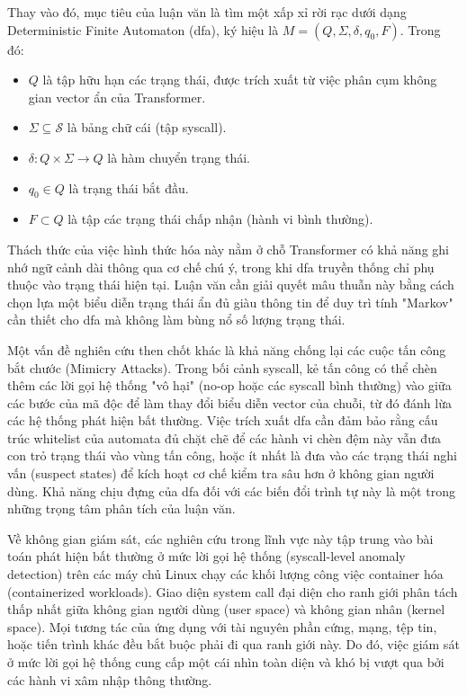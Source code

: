 \documentclass[../main.tex]{subfiles}
\begin{document}
Thay vào đó, mục tiêu của luận văn là tìm một xấp xỉ rời rạc dưới dạng
Deterministic Finite Automaton (\gls{dfa}), ký hiệu là $M = (Q, \Sigma,
\delta, q_0, F)$.
Trong đó:
\begin{itemize}
  \item $Q$ là tập hữu hạn các trạng thái, được trích xuất từ việc
    phân cụm không gian vector ẩn của Transformer.
  \item $\Sigma \subseteq \mathcal{S}$ là bảng chữ cái (tập \gls{syscall}).
  \item $\delta: Q \times \Sigma \to Q$ là hàm chuyển trạng thái.
  \item $q_0 \in Q$ là trạng thái bắt đầu.
  \item $F \subset Q$ là tập các trạng thái chấp nhận (hành vi bình thường).
\end{itemize}
Thách thức của việc hình thức hóa này nằm ở chỗ Transformer có khả năng
ghi nhớ ngữ cảnh dài thông qua cơ chế chú ý, trong khi \gls{dfa} truyền thống
chỉ phụ thuộc vào trạng thái hiện tại. Luận văn cần giải quyết mâu thuẫn
này bằng cách chọn lựa một biểu diễn trạng thái ẩn đủ giàu thông tin để
duy trì tính "Markov" cần thiết cho \gls{dfa} mà không làm bùng nổ số lượng
trạng thái.

Một vấn đề nghiên cứu then chốt khác là khả năng chống lại các cuộc
tấn công bắt chước (Mimicry Attacks). Trong bối cảnh \gls{syscall}, kẻ tấn
công có thể chèn thêm các lời gọi hệ thống "vô hại" (no-op hoặc các
\gls{syscall} bình thường) vào giữa các bước của mã độc để làm thay đổi
biểu diễn vector của chuỗi, từ đó đánh lừa các hệ thống phát hiện
bất thường. Việc trích xuất \gls{dfa} cần đảm bảo rằng cấu trúc whitelist
của automata đủ chặt chẽ để các hành vi chèn đệm này vẫn đưa con trỏ
trạng thái vào vùng tấn công, hoặc ít nhất là đưa vào các trạng thái
nghi vấn (suspect states) để kích hoạt cơ chế kiểm tra sâu hơn ở không gian
người dùng. Khả năng chịu đựng của \gls{dfa} đối với các biến đổi trình tự
này là một trong những trọng tâm phân tích của luận văn.

Về không gian giám sát, các nghiên cứu trong lĩnh vực này tập trung
vào bài toán phát hiện bất thường ở mức lời gọi hệ thống
(\gls{syscall}-level anomaly detection) trên các máy chủ Linux chạy các
khối lượng công việc container hóa (containerized workloads). Giao
diện system call đại diện cho ranh giới phân tách thấp nhất giữa
không gian người dùng (user space) và không gian nhân (kernel space).
Mọi tương tác của ứng dụng với tài nguyên phần cứng, mạng, tệp tin,
hoặc tiến trình khác đều bắt buộc phải đi qua ranh giới này. Do đó,
việc giám sát ở mức lời gọi hệ thống cung cấp một cái nhìn toàn diện
và khó bị vượt qua bởi các hành vi xâm nhập thông thường.
\end{document}
